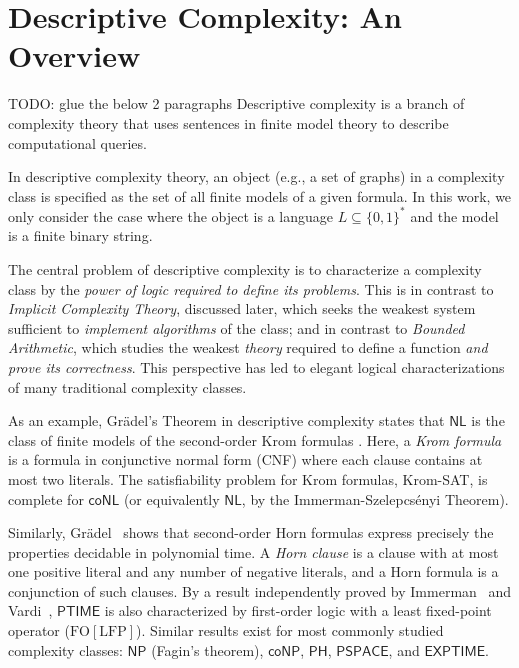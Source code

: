 
\section{Descriptive Complexity: An Overview}

TODO: glue the below 2 paragraphs
Descriptive complexity is a branch of complexity theory that uses sentences in finite model theory
to describe computational queries.

In descriptive complexity theory, an object (e.g., a set of graphs) in
a complexity class is specified as the set of all finite models of a given
formula. In this work, we only consider the case where the object is a language 
\(L \subseteq \{0,1\}^*\) and the model is a finite binary string.

The central problem of descriptive complexity is to characterize a
complexity class by the \emph{power of logic required to define its problems}.
This is in contrast to \emph{Implicit Complexity Theory}, discussed later,
which seeks the weakest system sufficient to \emph{implement algorithms}
of the class; and in contrast to \emph{Bounded Arithmetic}, which studies
the weakest \emph{theory} required to define a function \emph{and prove its correctness}.
This perspective has led to elegant logical characterizations of many traditional
complexity classes.

As an example, Grädel's Theorem in descriptive complexity states that
\(\mathsf{NL}\) is the class of finite models of the second-order Krom formulas
\cite{GRADEL199235}.
Here, a \emph{Krom formula} is a formula in conjunctive normal form (CNF)
where each clause contains at most
two literals. The satisfiability problem for Krom formulas, Krom-SAT, is
complete for \(\mathsf{coNL}\) (or equivalently \(\mathsf{NL}\), by the Immerman-Szelepcsényi
Theorem).

Similarly, Grädel~\cite{GRADEL199235} shows that second-order Horn formulas
express precisely the properties decidable in polynomial time.
A \emph{Horn clause} is a clause with at most one positive literal and any number
of negative literals, and a Horn formula is a conjunction of such clauses.
By a result independently proved by Immerman~\cite{IMMERMAN198686}
and Vardi~\cite{10.1145/800070.802186},
\(\mathsf{PTIME}\) is also characterized by first-order logic with a least fixed-point operator
(\(\mathrm{FO[LFP]}\)).
Similar results exist for most commonly studied complexity classes:
\(\mathsf{NP}\) (Fagin's theorem), \(\mathsf{coNP}\), \(\mathsf{PH}\), \(\mathsf{PSPACE}\), and \(\mathsf{EXPTIME}\).

